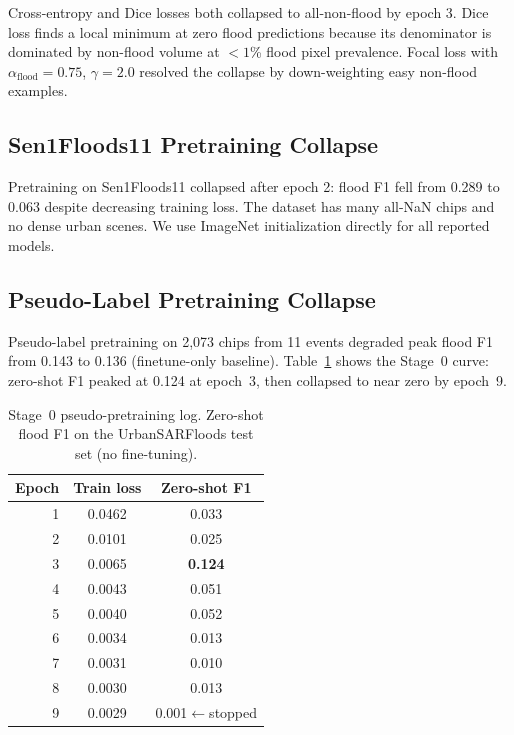 \documentclass[10pt,twocolumn]{article}
\begin{document}
Cross-entropy and Dice losses both collapsed to all-non-flood by epoch
3.  Dice loss finds a local minimum at zero flood predictions because
its denominator is dominated by non-flood volume at $<1$\% flood pixel
prevalence.  Focal loss with $\alpha_{\text{flood}}=0.75$, $\gamma=2.0$
resolved the collapse by down-weighting easy non-flood examples.

\subsection{Sen1Floods11 Pretraining Collapse}
\label{sec:s1collapse}

Pretraining on Sen1Floods11 collapsed after epoch 2: flood F1 fell from
0.289 to 0.063 despite decreasing training loss.  The dataset has
many all-NaN chips and no dense urban scenes.  We use ImageNet
initialization directly for all reported models.

\subsection{Pseudo-Label Pretraining Collapse}
\label{sec:pseudo_collapse}

Pseudo-label pretraining on 2,073 chips from 11 events degraded peak
flood F1 from 0.143 to 0.136 (finetune-only baseline).
Table~\ref{tab:pseudo_curve} shows the Stage~0 curve: zero-shot F1
peaked at 0.124 at epoch~3, then collapsed to near zero by epoch~9.

\begin{table}[h]
\centering\small
\caption{Stage~0 pseudo-pretraining log.  Zero-shot flood F1 on the
  UrbanSARFloods test set (no fine-tuning).}
\label{tab:pseudo_curve}
\begin{tabular}{rcc}
\toprule
Epoch & Train loss & Zero-shot F1 \\
\midrule
1 & 0.0462 & 0.033 \\
2 & 0.0101 & 0.025 \\
3 & 0.0065 & \textbf{0.124} \\
4 & 0.0043 & 0.051 \\
5 & 0.0040 & 0.052 \\
6 & 0.0034 & 0.013 \\
7 & 0.0031 & 0.010 \\
8 & 0.0030 & 0.013 \\
9 & 0.0029 & 0.001\quad$\leftarrow$stopped \\
\bottomrule
\end{tabular}
\end{table}
\end{document}
